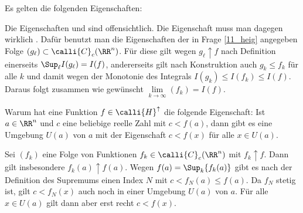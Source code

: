 \begin{antwort}
  Es gelten die folgenden Eigenschaften: 

  \noindent
  Die Eigenschaften  und  sind offensichtlich. 
  Die Eigenschaft  muss man dagegen 
  wirklich . Dafür benutzt man die Eigenschaften 
  der in Frage \ref{11_heig} angegeben Folge 
  $(g_\ell)\subset \calli{C}_c(\RR^n)$. Für diese 
  gilt wegen $g_\ell \uparrow f$ 
  nach Definition einerseits $\Sup_\ell I(g_\ell)=I(f)$, 
  andererseits gilt nach Konstruktion auch $g_k \le f_k$ für alle 
  $k$ und damit wegen der Monotonie des Integrals 
  $I(g_k)\le I(f_k) \le I(f)$. Daraus folgt 
  zusammen wie gewünscht $\lim\limits_{k\to\infty} (f_k)=I(f)$.     
  \AntEnd
\end{antwort}

\begin{frage}
  Warum hat eine Funktion $f\in\calli{H}^\uparrow$ 
  die folgende Eigenschaft: 
  Ist $a\in\RR^n$ und $c$ eine beliebige reelle Zahl mit 
  $c<f(a)$, dann gibt es eine 
  Umgebung $U(a)$ von $a$ mit der Eigenschaft $c<f(x)$ 
  f\"ur alle $x\in U(a)$.
\end{frage}

\begin{antwort}
  Sei $(f_k)$ eine Folge von Funktionen $f_k \in \calli{C}_c(\RR^n)$ 
  mit $f_k \uparrow f$. Dann gilt insbesondere 
  $f_k(a) \uparrow f(a)$. Wegen $f(a) = \Sup_k\{ f_k(a) \}$ 
  gibt es nach der Definition des Supremums einen Index $N$ mit 
  $c < f_N (a) \le f(a)$. 
  Da $f_N$ stetig ist, gilt $c< f_N(x)$ auch noch in einer 
  Umgebung $U(a)$ von $a$. 
  F\"ur alle $x\in U(a)$ gilt dann aber erst recht 
  $c< f(x)$. \AntEnd
\end{antwort}

